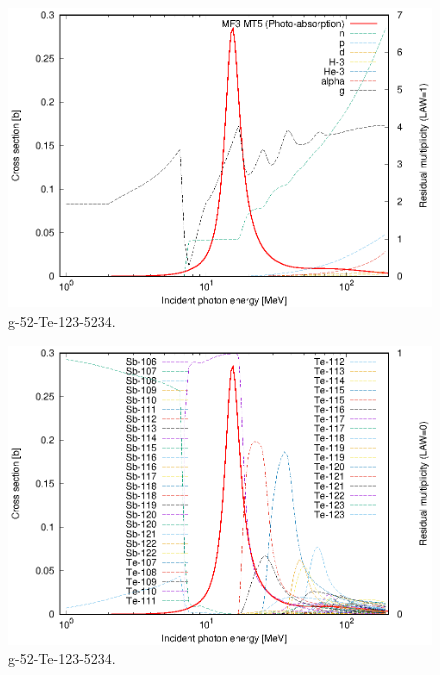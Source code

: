 \begin{figure}
 \includegraphics[width=\linewidth]{eps/g_52-Te-123_5234.eps}
  \caption{g-52-Te-123-5234.}
\end{figure}
\begin{figure}
 \includegraphics[width=\linewidth]{eps-law0/g_52-Te-123_5234.eps}
 \caption{g-52-Te-123-5234.}
\end{figure}
\newpage \clearpage

